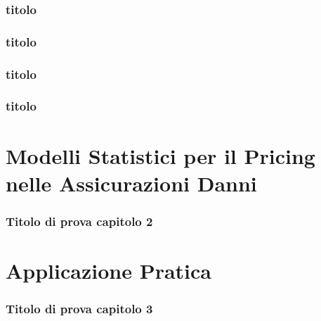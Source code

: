 \documentclass[pdf, aspectratio=169]{beamer}\usepackage[]{graphicx}\usepackage[]{color}
\theoremstyle{definition}
\begin{document}
\begin{frame}
\frametitle{titolo}

\end{frame}


\begin{frame}
\frametitle{titolo}

\end{frame}


\begin{frame}
\frametitle{titolo}

\end{frame}


\begin{frame}
\frametitle{titolo}

\end{frame}




\section{Modelli Statistici per il Pricing nelle Assicurazioni Danni}

\begin{frame}
\frametitle{Titolo di prova capitolo 2}

\end{frame}


\section{Applicazione Pratica}

\begin{frame}
\frametitle{Titolo di prova capitolo 3}

\end{frame}
\end{document}
